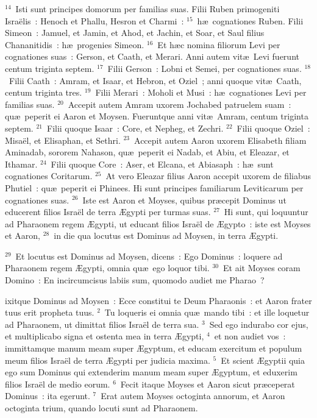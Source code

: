 ${}^{14}$~Isti sunt principes domorum per familias suas. Filii Ruben primogeniti Isra\"elis~: Henoch et Phallu, Hesron et Charmi~:
${}^{15}$~h\ae\ cognationes Ruben. Filii Simeon~: Jamuel, et Jamin, et Ahod, et Jachin, et Soar, et Saul filius Chananitidis~: h\ae\ progenies Simeon.
${}^{16}$~Et h\ae c nomina filiorum Levi per cognationes suas~: Gerson, et Caath, et Merari. Anni autem vit\ae\ Levi fuerunt centum triginta septem.
${}^{17}$~Filii Gerson~: Lobni et Semei, per cognationes suas.
${}^{18}$~Filii Caath~: Amram, et Isaar, et Hebron, et Oziel~; anni quoque vit\ae\ Caath, centum triginta tres.
${}^{19}$~Filii Merari~: Moholi et Musi~: h\ae\ cognationes Levi per familias suas.
${}^{20}$~Accepit autem Amram uxorem Jochabed patruelem suam~: qu\ae\ peperit ei Aaron et Moysen. Fueruntque anni vit\ae\ Amram, centum triginta septem.
${}^{21}$~Filii quoque Isaar~: Core, et Nepheg, et Zechri.
${}^{22}$~Filii quoque Oziel~: Misa\"el, et Elisaphan, et Sethri.
${}^{23}$~Accepit autem Aaron uxorem Elisabeth filiam Aminadab, sororem Nahason, qu\ae\ peperit ei Nadab, et Abiu, et Eleazar, et Ithamar.
${}^{24}$~Filii quoque Core~: Aser, et Elcana, et Abiasaph~: h\ae\ sunt cognationes Coritarum.
${}^{25}$~At vero Eleazar filius Aaron accepit uxorem de filiabus Phutiel~: qu\ae\ peperit ei Phinees. Hi sunt principes familiarum Leviticarum per cognationes suas.
${}^{26}$~Iste est Aaron et Moyses, quibus pr\ae cepit Dominus ut educerent filios Isra\"el de terra \AE gypti per turmas suas.
${}^{27}$~Hi sunt, qui loquuntur ad Pharaonem regem \AE gypti, ut educant filios Isra\"el de \AE gypto~: iste est Moyses et Aaron,
${}^{28}$~in die qua locutus est Dominus ad Moysen, in terra \AE gypti.


${}^{29}$~Et locutus est Dominus ad Moysen, dicens~: Ego Dominus~: loquere ad Pharaonem regem \AE gypti, omnia qu\ae\ ego loquor tibi.
${}^{30}$~Et ait Moyses coram Domino~: En incircumcisus labiis sum, quomodo audiet me Pharao~?

\bchapter
{}ixitque Dominus ad Moysen~: Ecce constitui te Deum Pharaonis~: et Aaron frater tuus erit propheta tuus.
${}^{2}$~Tu loqueris ei omnia qu\ae\ mando tibi~: et ille loquetur ad Pharaonem, ut dimittat filios Isra\"el de terra sua.
${}^{3}$~Sed ego indurabo cor ejus, et multiplicabo signa et ostenta mea in terra \AE gypti,
${}^{4}$~et non audiet vos~: immittamque manum meam super \AE gyptum, et educam exercitum et populum meum filios Isra\"el de terra \AE gypti per judicia maxima.
${}^{5}$~Et scient \AE gyptii quia ego sum Dominus qui extenderim manum meam super \AE gyptum, et eduxerim filios Isra\"el de medio eorum.
${}^{6}$~Fecit itaque Moyses et Aaron sicut pr\ae ceperat Dominus~: ita egerunt.
${}^{7}$~Erat autem Moyses octoginta annorum, et Aaron octoginta trium, quando locuti sunt ad Pharaonem.


